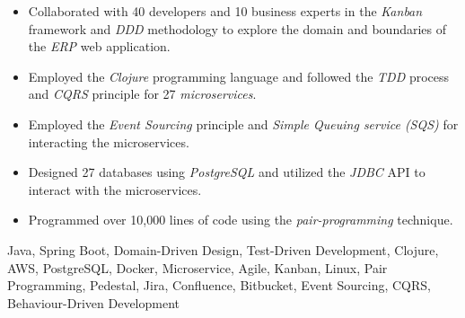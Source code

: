 \begin{experiences}
{
  \begin{itemize}
  \item Collaborated with 40 developers and 10 business experts in the \emph{Kanban} framework and \emph{DDD} methodology to explore the domain and boundaries of the \textit{ERP} web application.
  \item Employed the \emph{Clojure} programming language and followed the \emph{TDD} process and \textit{CQRS} principle for 27 \emph{microservices}.
  \item Employed the \textit{Event Sourcing} principle and \textit{Simple Queuing service (SQS)} for interacting the microservices.
  \item Designed 27 databases using \emph{PostgreSQL} and utilized the \emph{JDBC} API to interact with the microservices.
  \item Programmed over 10,000 lines of code using the \emph{pair-programming} technique.
  \end{itemize}
  }
  {Java, Spring Boot, Domain-Driven Design, Test-Driven Development, Clojure, AWS, PostgreSQL, Docker, Microservice, Agile, Kanban, Linux, Pair Programming, Pedestal, Jira, Confluence, Bitbucket, Event Sourcing, CQRS, Behaviour-Driven Development}
  
 \emptySeparator
  

\end{experiences}
